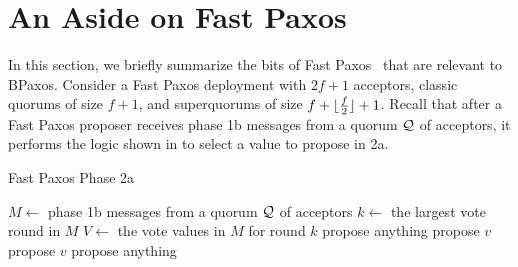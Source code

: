 \section{An Aside on Fast Paxos}
In this section, we briefly summarize the bits of Fast
Paxos~\cite{lamport2006fast} that are relevant to BPaxos.
%
Consider a Fast Paxos deployment with $2f + 1$ acceptors, classic quorums of
size $f + 1$, and superquorums of size $f + \lfloor\frac{f}{2}\rfloor + 1$. Recall that
after a Fast Paxos proposer receives phase 1b messages from a quorum $\mathcal{Q}$
of acceptors, it performs the logic shown in  to select a
value to propose in 2a.

\begin{algorithm}[ht]
  \caption{Fast Paxos Phase 2a}%
  \begin{algorithmic}[1]
    \State{} $M \gets$ phase 1b messages from a quorum $\mathcal{Q}$ of acceptors
    \State{} $k \gets$ the largest vote round in $M$
    \State{} $V \gets$ the vote values in $M$ for round $k$
      \State{} propose anything
      \State{} propose $v$
      \State{} propose $v$
    \Else{}
      \State{} propose anything
    \EndIf{}
  \end{algorithmic}
\end{algorithm}

